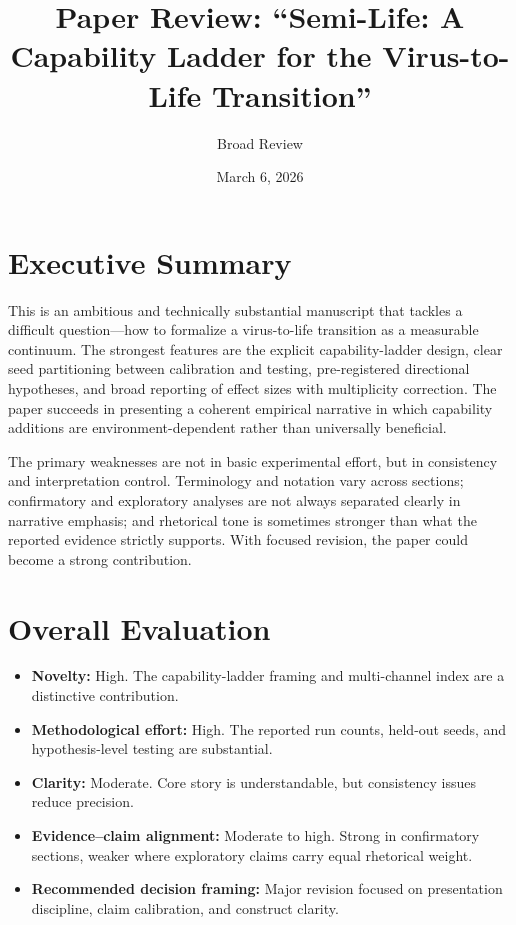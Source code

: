\documentclass[11pt]{article}
\title{Paper Review: ``Semi-Life: A Capability Ladder for the Virus-to-Life Transition''}
\author{Broad Review}
\date{March 6, 2026}
\begin{document}
\maketitle

\section*{Executive Summary}
This is an ambitious and technically substantial manuscript that tackles a difficult question---how to formalize a virus-to-life transition as a measurable continuum. The strongest features are the explicit capability-ladder design, clear seed partitioning between calibration and testing, pre-registered directional hypotheses, and broad reporting of effect sizes with multiplicity correction. The paper succeeds in presenting a coherent empirical narrative in which capability additions are environment-dependent rather than universally beneficial.

The primary weaknesses are not in basic experimental effort, but in consistency and interpretation control. Terminology and notation vary across sections; confirmatory and exploratory analyses are not always separated clearly in narrative emphasis; and rhetorical tone is sometimes stronger than what the reported evidence strictly supports. With focused revision, the paper could become a strong contribution.

\section*{Overall Evaluation}
\begin{itemize}[leftmargin=1.5em]
  \item \textbf{Novelty:} High. The capability-ladder framing and multi-channel index are a distinctive contribution.
  \item \textbf{Methodological effort:} High. The reported run counts, held-out seeds, and hypothesis-level testing are substantial.
  \item \textbf{Clarity:} Moderate. Core story is understandable, but consistency issues reduce precision.
  \item \textbf{Evidence--claim alignment:} Moderate to high. Strong in confirmatory sections, weaker where exploratory claims carry equal rhetorical weight.
  \item \textbf{Recommended decision framing:} Major revision focused on presentation discipline, claim calibration, and construct clarity.
\end{itemize}
\end{document}
